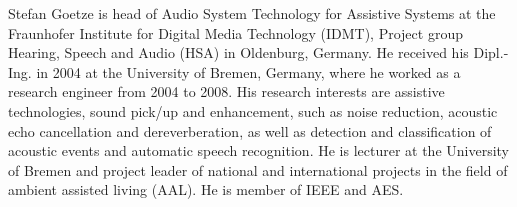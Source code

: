 \documentclass[10pt]{IEEEtran}
\begin{document}
\begin{IEEEbiography}{Stefan Goetze}
is head of Audio System Technology for Assistive Systems at the Fraunhofer Institute for Digital Media Technology (IDMT), Project group Hearing, Speech and Audio (HSA) in Oldenburg, Germany.
He received his Dipl.-Ing. in 2004 at the University of Bremen, Germany, where he worked as a research engineer from 2004 to 2008.
His research interests are assistive technologies, sound pick/up and enhancement, such as noise reduction, acoustic echo cancellation and dereverberation, as well as detection and classification of acoustic events and automatic speech recognition.
He is lecturer at the University of Bremen and project leader of national and international projects in the field of ambient assisted living (AAL).
He is member of IEEE and AES.
\vspace{-1.02cm}
\end{IEEEbiography}
\end{document}
